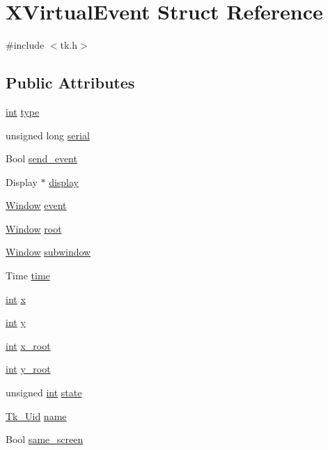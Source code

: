 \hypertarget{struct_x_virtual_event}{}\section{X\+Virtual\+Event Struct Reference}
\label{struct_x_virtual_event}


{\ttfamily \#include $<$tk.\+h$>$}

\subsection*{Public Attributes}
\begin{DoxyCompactItemize}
\item 
\hyperlink{tk_8h_a83f82f76e7fed06f4c49d2db94028a6d}{int} \hyperlink{struct_x_virtual_event_a46f6ad78d08808570f263d970aeacbc6}{type}
\item 
unsigned long \hyperlink{struct_x_virtual_event_ad614021bf9afa4ce30e1e8e6392602bb}{serial}
\item 
Bool \hyperlink{struct_x_virtual_event_a2c0d3ff68c6dccd710deee1dea489d28}{send\+\_\+event}
\item 
Display $\ast$ \hyperlink{struct_x_virtual_event_a7dedf3f4860eb1f29f87b424f12c6dd1}{display}
\item 
\hyperlink{tk_8h_a98fe30ba305baa90aa6ae1f474c1e338}{Window} \hyperlink{struct_x_virtual_event_acf440f24fc41ffff42a268d61c0cd979}{event}
\item 
\hyperlink{tk_8h_a98fe30ba305baa90aa6ae1f474c1e338}{Window} \hyperlink{struct_x_virtual_event_abf43af16321970ff60633711902760de}{root}
\item 
\hyperlink{tk_8h_a98fe30ba305baa90aa6ae1f474c1e338}{Window} \hyperlink{struct_x_virtual_event_a982abbd9fb51b176fbeb2564637bd70e}{subwindow}
\item 
Time \hyperlink{struct_x_virtual_event_abc37c141d38cdc1072cb9e179f29fd54}{time}
\item 
\hyperlink{tk_8h_a83f82f76e7fed06f4c49d2db94028a6d}{int} \hyperlink{struct_x_virtual_event_a1956d61ba91422712cdf5db29206ffd2}{x}
\item 
\hyperlink{tk_8h_a83f82f76e7fed06f4c49d2db94028a6d}{int} \hyperlink{struct_x_virtual_event_a417c92c5291f14eb8721f60ac1bf4777}{y}
\item 
\hyperlink{tk_8h_a83f82f76e7fed06f4c49d2db94028a6d}{int} \hyperlink{struct_x_virtual_event_ad3d8e1e33d3810c1e8a927c1ea875c36}{x\+\_\+root}
\item 
\hyperlink{tk_8h_a83f82f76e7fed06f4c49d2db94028a6d}{int} \hyperlink{struct_x_virtual_event_adf3f0dd9e602414f1f017c4d4e300e85}{y\+\_\+root}
\item 
unsigned \hyperlink{tk_8h_a83f82f76e7fed06f4c49d2db94028a6d}{int} \hyperlink{struct_x_virtual_event_a2a8cd11e6c02cb5cf3fddce8c804ccc8}{state}
\item 
\hyperlink{tk_8h_aab6f7e0c4f113c8e02feee260e7c4414}{Tk\+\_\+\+Uid} \hyperlink{struct_x_virtual_event_ae3b21c9f99b80aa02c11f6a34334a3cc}{name}
\item 
Bool \hyperlink{struct_x_virtual_event_a24217e3ff01619f3c193633adf47d8d3}{same\+\_\+screen}
\end{DoxyCompactItemize}



